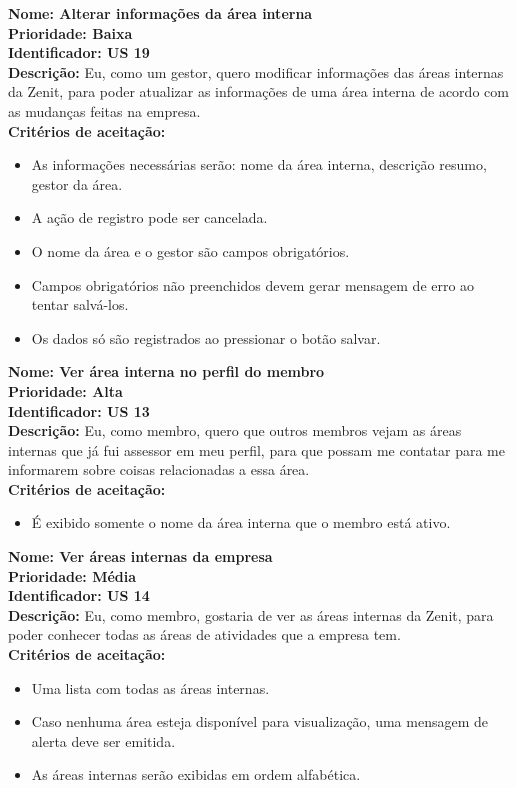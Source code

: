 \begin{anexosenv}
\indent \textbf{Nome: Alterar informações da área interna\\
\indent Prioridade: Baixa\\
\indent Identificador: US 19\\
\indent Descrição: }Eu, como um gestor, quero modificar informações das áreas internas da Zenit, para poder atualizar as informações de uma área interna de acordo com as mudanças feitas na empresa.\\
\indent \textbf{Critérios de aceitação:}
\begin{itemize}
    \item As informações necessárias serão: nome da área interna, descrição resumo, gestor da área.
    \item A ação de registro pode ser cancelada.
    \item O nome da área e o gestor são campos obrigatórios.
    \item Campos obrigatórios não preenchidos devem gerar mensagem de erro ao tentar salvá-los.
    \item Os dados só são registrados ao pressionar o botão salvar.
\end{itemize}

\indent \textbf{Nome: Ver área interna no perfil do membro\\
\indent Prioridade: Alta\\
\indent Identificador: US 13\\
\indent Descrição: }Eu, como membro, quero que outros membros vejam as áreas internas que já fui assessor em meu perfil, para que possam me contatar para me informarem sobre coisas relacionadas a essa área.\\
\indent \textbf{Critérios de aceitação:}
\begin{itemize}
    \item É exibido somente o nome da área interna que o membro está ativo.
\end{itemize}

\indent \textbf{Nome: Ver áreas internas da empresa\\
\indent Prioridade: Média\\
\indent Identificador: US 14\\
\indent Descrição: }Eu, como membro, gostaria de ver as áreas internas da Zenit, para poder conhecer todas as áreas de atividades que a empresa tem.\\
\indent \textbf{Critérios de aceitação:}
\begin{itemize}
    \item Uma lista com todas as áreas internas.
    \item Caso nenhuma área esteja disponível para visualização, uma mensagem de alerta deve ser emitida.
    \item As áreas internas serão exibidas em ordem alfabética.
\end{itemize}


\end{anexosenv}
